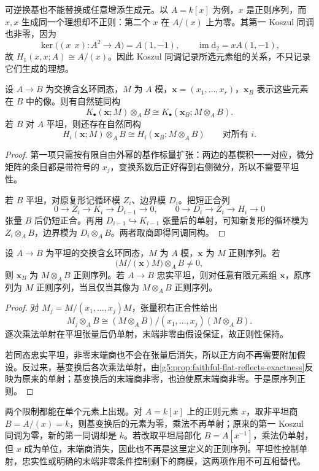 可逆换基也不能替换成任意增添生成元。以 \(A=k[x]\) 为例，\(x\) 是正则序列，而 \(x,x\) 生成同一个理想却不正则：第二个 \(x\) 在 \(A/(x)\) 上为零。其第一 Koszul 同调也非零，因为
\[
	\ker\bigl((x\ \ x):A^2\to A\bigr)=A(1,-1),
	\qquad
	\operatorname{im}\mathrm d_2=xA(1,-1),
\]
故 \(H_1(x,x;A)\cong A/(x)\)。因此 Koszul 同调记录所选元素组的关系，不只记录它们生成的理想。

\begin{proposition}\label{g5:prop:koszul-base-change}
	设 \(A\to B\) 为交换含幺环同态，\(M\) 为 \(A\) 模，\(\mathbf x=(x_1,\ldots,x_r)\)，\(\mathbf x_B\) 表示这些元素在 \(B\) 中的像。则有自然链同构
	\[
		K_\bullet(\mathbf x;M)\otimes_A B
		\cong K_\bullet(\mathbf x_B;M\otimes_A B).
	\]
	若 \(B\) 对 \(A\) 平坦，则还存在自然同构
	\[
		H_i(\mathbf x;M)\otimes_A B
		\cong H_i(\mathbf x_B;M\otimes_A B)
		\qquad\text{对所有 }i.
	\]
\end{proposition}
\begin{proof}
	第一项只需按有限自由外幂的基作标量扩张：两边的基楔积一一对应，微分矩阵的条目都是带符号的 \(x_j\)，变换系数后正好得到右侧微分，所以不需要平坦性。

	若 \(B\) 平坦，对原复形记循环模 \(Z_i\)、边界模 \(D_i\)。把短正合列
	\[
		0\longrightarrow Z_i\longrightarrow K_i\longrightarrow D_{i-1}\longrightarrow0,
		\qquad
		0\longrightarrow D_i\longrightarrow Z_i\longrightarrow H_i\longrightarrow0
	\]
	张量 \(B\) 后仍短正合。再用 \(D_{i-1}\hookrightarrow K_{i-1}\) 张量后的单射，可知新复形的循环模为 \(Z_i\otimes_A B\)，边界模为 \(D_i\otimes_A B\)。两者取商即得同调同构。
\end{proof}

\begin{proposition}\label{g5:prop:regular-sequence-flat-base-change}
	设 \(A\to B\) 为平坦的交换含幺环同态，\(M\) 为 \(A\) 模，\(\mathbf x\) 为 \(M\) 正则序列。若
	\[
		\bigl(M/(\mathbf x)M\bigr)\otimes_A B\ne0,
	\]
	则 \(\mathbf x_B\) 为 \(M\otimes_A B\) 正则序列。若 \(A\to B\) 忠实平坦，则对任意有限元素组 \(\mathbf x\)，原序列为 \(M\) 正则序列，当且仅当其像为 \(M\otimes_A B\) 正则序列。
\end{proposition}
\begin{proof}
	对 \(M_j=M/(x_1,\ldots,x_j)M\)，张量积右正合性给出
	\[
		M_j\otimes_A B
		\cong (M\otimes_A B)/(x_1,\ldots,x_j)(M\otimes_A B).
	\]
	逐次乘法单射在平坦张量后仍单射，末端非零由假设保证，故正则性保持。

	若同态忠实平坦，非零末端商也不会在张量后消失，所以正方向不再需要附加假设。反过来，基变换后各次乘法单射，由\cref{g5:prop:faithful-flat-reflects-exactness}反映为原来的单射；基变换后的末端商非零，也迫使原末端商非零。于是原序列正则。
\end{proof}

两个限制都能在单个元素上出现。对 \(A=k[x]\) 上的正则元素 \(x\)，取非平坦商 \(B=A/(x)=k\)，则基变换后的元素为零，乘法不再单射；原来的第一 Koszul 同调为零，新的第一同调却是 \(k\)。若改取平坦局部化 \(B=A[x^{-1}]\)，乘法仍单射，但 \(x\) 成为单位，末端商消失，因此也不再是这里定义的正则序列。平坦性控制单射，忠实性或明确的末端非零条件控制剩下的商模，这两项作用不可互相替代。
